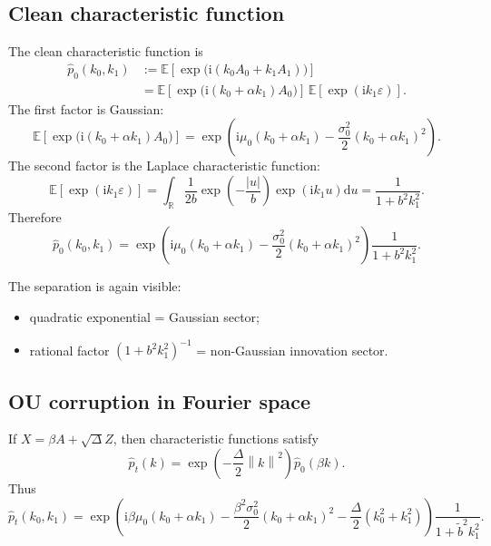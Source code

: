 \documentclass[11pt]{article}
\newcommand{\R}{\mathbb{R}}
\newcommand{\E}{\mathbb{E}}
\newcommand{\dd}{\mathrm{d}}
\newcommand{\ii}{\mathrm{i}}
\newcommand{\1}{\mathbf{1}}
\newcommand{\sq}[1]{\left[#1\right]}
\newcommand{\norm}[1]{\left\lVert #1 \right\rVert}
\theoremstyle{definition}
\begin{document}
\subsection{Clean characteristic function}

The clean characteristic function is
\begin{align}
\widehat p_0(k_0,k_1)
&:= \E\sq{\exp\!\big(\ii(k_0A_0+k_1A_1)\big)} \\
&= \E\sq{\exp\!\big(\ii(k_0+\alpha k_1)A_0\big)}\, \E\sq{\exp(\ii k_1 \varepsilon)}.
\end{align}
The first factor is Gaussian:
\begin{equation}
\E\sq{\exp\!\big(\ii(k_0+\alpha k_1)A_0\big)}
=
\exp\!\left(\ii\mu_0(k_0+\alpha k_1)-\frac{\sigma_0^2}{2}(k_0+\alpha k_1)^2\right).
\end{equation}
The second factor is the Laplace characteristic function:
\begin{equation}
\E\sq{\exp(\ii k_1 \varepsilon)}
=
\int_{\R} \frac{1}{2b}\exp\!\left(-\frac{|u|}{b}\right)\exp(\ii k_1u)\dd u
=
\frac{1}{1+b^2k_1^2}.
\end{equation}
Therefore
\begin{equation}
\label{eq:clean-char-function}
\boxed{
\widehat p_0(k_0,k_1)
=
\exp\!\left(\ii\mu_0(k_0+\alpha k_1)-\frac{\sigma_0^2}{2}(k_0+\alpha k_1)^2\right)
\frac{1}{1+b^2k_1^2}.
}
\end{equation}

The separation is again visible:
\begin{itemize}[leftmargin=2em]
    \item quadratic exponential = Gaussian sector;
    \item rational factor \((1+b^2k_1^2)^{-1}\) = non-Gaussian innovation sector.
\end{itemize}

\subsection{OU corruption in Fourier space}

If \(X=\beta A+\sqrt{\Delta}Z\), then characteristic functions satisfy
\begin{equation}
\widehat p_t(k)=\exp\!\left(-\frac{\Delta}{2}\norm{k}^2\right)\widehat p_0(\beta k).
\end{equation}
Thus
\begin{equation}
\label{eq:noisy-char-function}
\boxed{
\widehat p_t(k_0,k_1)
=
\exp\!\left(
\ii\beta\mu_0(k_0+\alpha k_1)
-\frac{\beta^2\sigma_0^2}{2}(k_0+\alpha k_1)^2
-\frac{\Delta}{2}(k_0^2+k_1^2)
\right)
\frac{1}{1+\tilde b^2k_1^2}.
}
\end{equation}
\end{document}
